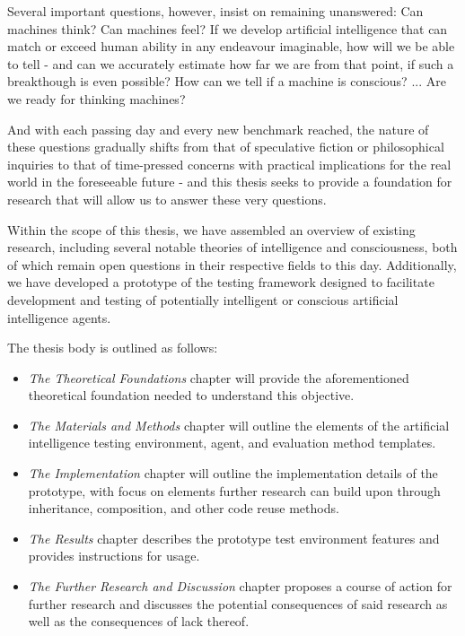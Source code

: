 \documentclass[masterthesis]{fer}
\begin{document}
Several important questions, however, insist on remaining unanswered: Can machines think? Can machines feel? If we develop artificial intelligence that can match or exceed human ability in any endeavour imaginable, how will we be able to tell - and can we accurately estimate how far we are from that point, if such a breakthough is even possible? How can we tell if a machine is conscious? ... Are we ready for thinking machines?

And with each passing day and every new benchmark reached, the nature of these questions gradually shifts from that of speculative fiction or philosophical inquiries to that of time-pressed concerns with practical implications for the real world in the foreseeable future - and this thesis seeks to provide a foundation for research that will allow us to answer these very questions.

Within the scope of this thesis, we have assembled an overview of existing research, including several notable theories of intelligence and consciousness, both of which remain open questions in their respective fields to this day. Additionally, we have developed a prototype of the testing framework designed to facilitate development and testing of potentially intelligent or conscious artificial intelligence agents.

The thesis body is outlined as follows:
\begin{itemize}
\item{\textit{The Theoretical Foundations} chapter will provide the aforementioned theoretical foundation needed to understand this objective.}
\item{\textit{The Materials and Methods} chapter will outline the elements of the artificial intelligence testing environment, agent, and evaluation method templates.}
\item{\textit{The Implementation} chapter will outline the implementation details of the prototype, with focus on elements further research can build upon through inheritance, composition, and other code reuse methods.}
\item{\textit{The Results} chapter describes the prototype test environment features and provides instructions for usage.}
\item{\textit{The Further Research and Discussion} chapter proposes a course of action for further research and discusses the potential consequences of said research as well as the consequences of lack thereof.}
\end{itemize}
\end{document}
